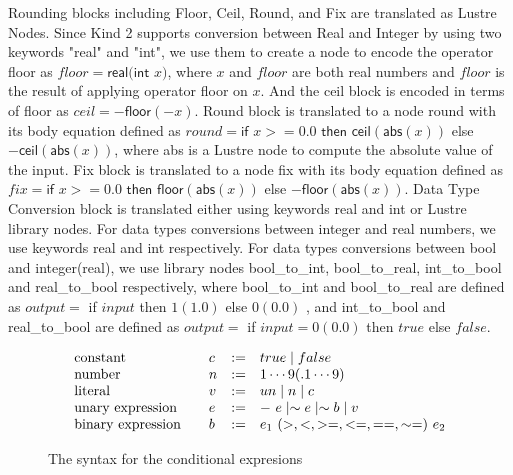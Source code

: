 \documentclass{article}
\begin{document}
Rounding blocks including \textsf{Floor, Ceil, Round}, and \textsf{Fix} are translated as Lustre Nodes. 
Since Kind 2 supports conversion between Real and Integer by using two keywords \textsf{"real"} and \textsf{"int"},
we use them to create a node to encode the operator \textsf{floor} as $floor = \textsf{real} (\textsf{int}$ $x)$, where $x$ and $floor$ are both real numbers and $floor$ is the result of applying operator \textsf{floor} on $x$. 
And the \textsf{ceil} block is encoded in terms of \textsf{floor} as $ceil = -\textsf{floor}(-x)$.
Round block is translated to a node \textsf{round} with its body equation defined as $round = \textsf{if}$ $x >= 0.0$ $\textsf{then}$ $\textsf{ceil}(\textsf{abs}(x))$ \textsf{else} $-\textsf{ceil}(\textsf{abs}(x))$, where \textsf{abs} is a Lustre node to compute the absolute value of the input.
Fix block is translated to a node \textsf{fix} with its body equation defined as $fix = \textsf{if}$ $x >= 0.0$ $\textsf{then}$ $\textsf{floor}(\textsf{abs}(x))$ \textsf{else} $-\textsf{floor}(\textsf{abs}(x))$.
Data Type Conversion block is translated either using keywords \textsf{real} and \textsf{int} or Lustre library nodes. 
For data types conversions between integer and real numbers, we use keywords \textsf{real} and \textsf{int} respectively. 
For data types conversions between \textsf{bool} and \textsf{integer(real)}, we use library nodes \textsf{bool\_to\_int, bool\_to\_real, int\_to\_bool} and \textsf{real\_to\_bool} respectively, where \textsf{bool\_to\_int} and \textsf{bool\_to\_real} are defined as $output =$ \textsf{if} $input$ \textsf{then} $1(1.0)$ \textsf{else} $0(0.0)$
, and \textsf{int\_to\_bool} and \textsf{real\_to\_bool} are defined as $output =$ \textsf{if} $input = 0(0.0)$ \textsf{then} $true$ \textsf{else} $false$.


\begin{figure}[t]
\[
\begin{array}{l@{\qquad}llll}
 \text{constant} & c & := & 
true \mid false
 \\[0ex]
 \text{number} & n & := & 
 1 \cdots 9 (.1 \cdots 9)
 \\[0ex]
  \text{literal} & v & := & 
u n \mid n \mid c
 \\[0ex]
\text{unary expression} & e & := & 
-\ e \mid \sim e \mid \sim b \mid v
 \\[0ex]
 \text{binary expression} & b & := & 
e_1\ (>, <, >=, <=, ==, \sim=)\ e_2 
 \\[0ex]
\end{array}       
\]
\caption{The syntax for the conditional expresions}
\label{fig:grammar}
\end{figure}
\end{document}
